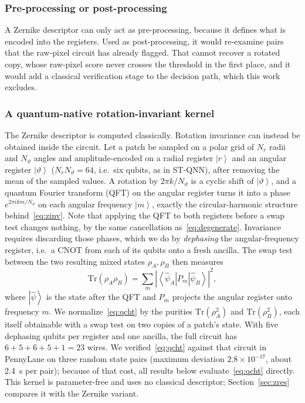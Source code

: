 \documentclass[conference]{IEEEtran}
\newcommand{\ket}[1]{\left|#1\right\rangle}
\newcommand{\bra}[1]{\left\langle#1\right|}
\begin{document}
\subsubsection{Pre-processing or post-processing}
A Zernike descriptor can only act as pre-processing, because it defines what is encoded into the registers. Used as post-processing, it would re-examine pairs that the raw-pixel circuit has already flagged. That cannot recover a rotated copy, whose raw-pixel score never crosses the threshold in the first place, and it would add a classical verification stage to the decision path, which this work excludes.

\subsubsection{A quantum-native rotation-invariant kernel}\label{sec:qcht}
The Zernike descriptor is computed classically. Rotation invariance can instead be obtained inside the circuit. Let a patch be sampled on a polar grid of $N_r$ radii and $N_\vartheta$ angles and amplitude-encoded on a radial register $\ket{r}$ and an angular register $\ket{\vartheta}$ ($N_rN_\vartheta = 64$, i.e.\ six qubits, as in ST-QNN), after removing the mean of the sampled values. A rotation by $2\pi k/N_\vartheta$ is a cyclic shift of $\ket{\vartheta}$, and a quantum Fourier transform (QFT) on the angular register turns it into a phase $e^{2\pi i km/N_\vartheta}$ on each angular frequency $\ket{m}$, exactly the circular-harmonic structure behind~\eqref{eq:zinv}. Note that applying the QFT to both registers before a swap test changes nothing, by the same cancellation as~\eqref{eq:degenerate}. Invariance requires discarding those phases, which we do by \emph{dephasing} the angular-frequency register, i.e.\ a CNOT from each of its qubits onto a fresh ancilla. The swap test between the two resulting mixed states $\rho_A,\rho_B$ then measures
\begin{equation}
\mathrm{Tr}(\rho_A\rho_B) = \sum_m \left|\bra{\hat\psi_A}P_m\ket{\hat\psi_B}\right|^2,
\label{eq:qcht}
\end{equation}
where $\ket{\hat\psi}$ is the state after the QFT and $P_m$ projects the angular register onto frequency $m$. We normalize~\eqref{eq:qcht} by the purities $\mathrm{Tr}(\rho_A^2)$ and $\mathrm{Tr}(\rho_B^2)$, each itself obtainable with a swap test on two copies of a patch's state. With five dephasing qubits per register and one ancilla, the full circuit has $6+5+6+5+1 = 23$ wires. We verified~\eqref{eq:qcht} against that circuit in PennyLane on three random state pairs (maximum deviation $2.8\times10^{-17}$, about 2.4~s per pair); because of that cost, all results below evaluate~\eqref{eq:qcht} directly. This kernel is parameter-free and uses no classical descriptor; Section~\ref{sec:zres} compares it with the Zernike variant.
\end{document}
